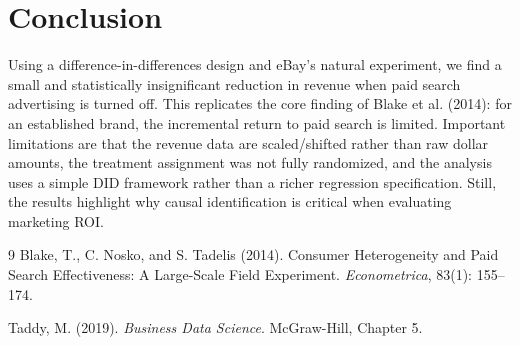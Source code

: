 \documentclass[12pt]{article}
\begin{document}
\section{Conclusion}
Using a difference-in-differences design and eBay's natural experiment, we find a small and statistically
insignificant reduction in revenue when paid search advertising is turned off. This replicates the core
finding of Blake et al. (2014): for an established brand, the incremental return to paid search is limited.
Important limitations are that the revenue data are scaled/shifted rather than raw dollar amounts, the
treatment assignment was not fully randomized, and the analysis uses a simple DID framework rather than
a richer regression specification. Still, the results highlight why causal identification is critical when
evaluating marketing ROI.

\begin{thebibliography}{9}
Blake, T., C. Nosko, and S. Tadelis (2014).
Consumer Heterogeneity and Paid Search Effectiveness: A Large-Scale Field Experiment.
\textit{Econometrica}, 83(1): 155--174.

Taddy, M. (2019).
\textit{Business Data Science}. McGraw-Hill, Chapter 5.
\end{thebibliography}
\end{document}
